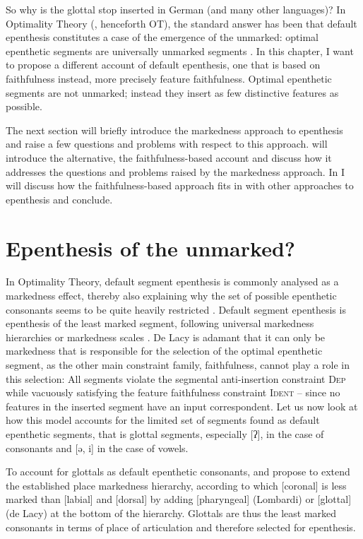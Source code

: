 \documentclass[output=paper,colorlinks,citecolor=brown]{langscibook}
\begin{document}

So why is the glottal stop inserted in German (and many other languages)? In Optimality Theory (\citealt{ps93}, henceforth OT), the standard answer has been that default epenthesis constitutes a case of the emergence of the unmarked: optimal epenthetic segments are universally unmarked segments \citep{lombardi02, lombardi03, delacy06}. In this chapter, I want to propose a different account of default epenthesis, one that is based on faithfulness instead, more precisely feature faithfulness. Optimal epenthetic segments are not unmarked; instead they insert as few distinctive features as possible. 

The next section will briefly introduce the markedness approach to epenthesis and raise a few questions and problems with respect to this approach.  will introduce the alternative, the faithfulness-based account and discuss how it addresses the questions and problems raised by the markedness approach. In  I will discuss how the faithfulness-based approach fits in with other approaches to epenthesis and conclude.


\section{Epenthesis of the unmarked?}

In Optimality Theory, default segment epenthesis is commonly analysed as a markedness effect, thereby also explaining why the set of possible epenthetic consonants seems to be quite heavily restricted \citep{lombardi02, lombardi03, delacy06}. Default segment epenthesis is epenthesis of the least marked segment, following universal markedness hierarchies \citep{lombardi02, lombardi03} or markedness scales \citep{delacy06}. De Lacy is adamant that it can only be markedness that is responsible for the selection of the optimal epenthetic segment, as the other main constraint family, faithfulness, cannot play a role in this selection: All segments violate the segmental anti-insertion constraint \textsc{Dep} while vacuously satisfying the feature faithfulness constraint \textsc{Ident} -- since no features in the inserted segment have an input correspondent. Let us now look at how this model accounts for the limited set of segments found as default epenthetic segments, that is glottal segments, especially [ʔ], in the case of consonants and [ə, i] in the case of vowels. 

To account for glottals as default epenthetic consonants, \citet{lombardi02} and \citet{delacy06} propose to extend the established place markedness hierarchy, according to which [coronal] is less marked than [labial] and [dorsal] by adding [pharyngeal] (Lombardi) or [glottal] (de Lacy) at the bottom of the hierarchy. Glottals are thus the least marked consonants in terms of place of articulation and therefore selected for epenthesis. 
\end{document}
